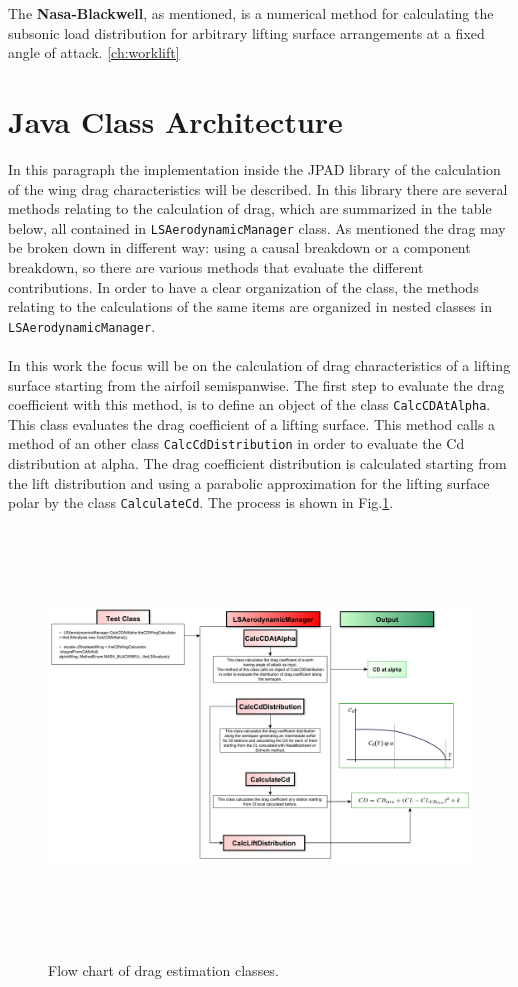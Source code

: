 The {\bfseries Nasa-Blackwell}, as mentioned, is a numerical method for calculating the subsonic load distribution for arbitrary lifting surface arrangements at a fixed angle of attack. \ref{ch:worklift}


\section{Java Class Architecture}

In this paragraph the implementation inside the JPAD library of the calculation of the wing drag characteristics will be described. In this library there are several methods relating to the calculation of drag, which are summarized in the table below, all contained in \texttt{LSAerodynamicManager} class. As mentioned the drag may be broken down in different way: using a causal breakdown or a component breakdown, so there are various methods that evaluate the different contributions. In order to have a clear organization of the class, the methods relating to the calculations of the same items are organized in nested classes in  \texttt{LSAerodynamicManager}.\\ \\

In this work the focus will be on the calculation of drag characteristics of a lifting surface starting from the airfoil semispanwise. The first step to evaluate the drag coefficient with this method, is to define an object of the class  \texttt{CalcCDAtAlpha}. This class evaluates the drag coefficient of a lifting surface. This method calls  a method of an other class \texttt{CalcCdDistribution} in order to evaluate the Cd distribution at alpha. The drag coefficient distribution is calculated starting from the lift distribution and using a parabolic approximation for the lifting surface polar by the class \texttt{CalculateCd}. The process is shown in Fig.\ref{fig:cd}.


\begin{figure}
\centering
{\includegraphics[height=11cm, angle=90]{immagini/dragflowchart.pdf}}
\caption{Flow chart of drag estimation classes.}
\label{fig:cd}
\end{figure}

